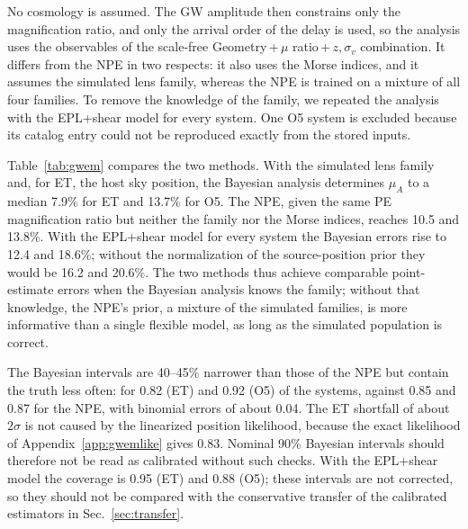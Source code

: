 No cosmology is assumed. The GW amplitude then constrains only the magnification ratio, and only the arrival order of the delay is used, so the analysis uses the observables of the scale-free Geometry\,+\,$\mu$ ratio\,+\,$z,\sigma_v$ combination. It differs from the NPE in two respects: it also uses the Morse indices, and it assumes the simulated lens family, whereas the NPE is trained on a mixture of all four families. To remove the knowledge of the family, we repeated the analysis with the EPL+shear model for every system. One O5 system is excluded because its catalog entry could not be reproduced exactly from the stored inputs.

Table~\ref{tab:gwem} compares the two methods. With the simulated lens family and, for ET, the host sky position, the Bayesian analysis determines $\mu_A$ to a median 7.9\% for ET and 13.7\% for O5. The NPE, given the same PE magnification ratio but neither the family nor the Morse indices, reaches 10.5 and 13.8\%. With the EPL+shear model for every system the Bayesian errors rise to 12.4 and 18.6\%; without the normalization of the source-position prior they would be 16.2 and 20.6\%. The two methods thus achieve comparable point-estimate errors when the Bayesian analysis knows the family; without that knowledge, the NPE's prior, a mixture of the simulated families, is more informative than a single flexible model, as long as the simulated population is correct.

The Bayesian intervals are 40--45\% narrower than those of the NPE but contain the truth less often: for 0.82 (ET) and 0.92 (O5) of the systems, against 0.85 and 0.87 for the NPE, with binomial errors of about 0.04. The ET shortfall of about $2\sigma$ is not caused by the linearized position likelihood, because the exact likelihood of Appendix~\ref{app:gwemlike} gives 0.83. Nominal 90\% Bayesian intervals should therefore not be read as calibrated without such checks. With the EPL+shear model the coverage is 0.95 (ET) and 0.88 (O5); these intervals are not corrected, so they should not be compared with the conservative transfer of the calibrated estimators in Sec.~\ref{sec:transfer}.

\begin{table}
\caption{Bayesian GW+EM reconstruction and NPE for the same systems: median relative error of $\mu_A$ and coverage of the 90\% interval, for 60 systems per scenario (59 for the O5 Bayesian analyses). No cosmology is assumed. ET uses the host sky position, O5 a free sky position. The NPE uses the scale-free Geometry\,+\,$\mu$ ratio\,+\,$z,\sigma_v$ observables, with the magnification ratio from the SNR-based model or from joint PE.}
\label{tab:gwem}

\end{table}
